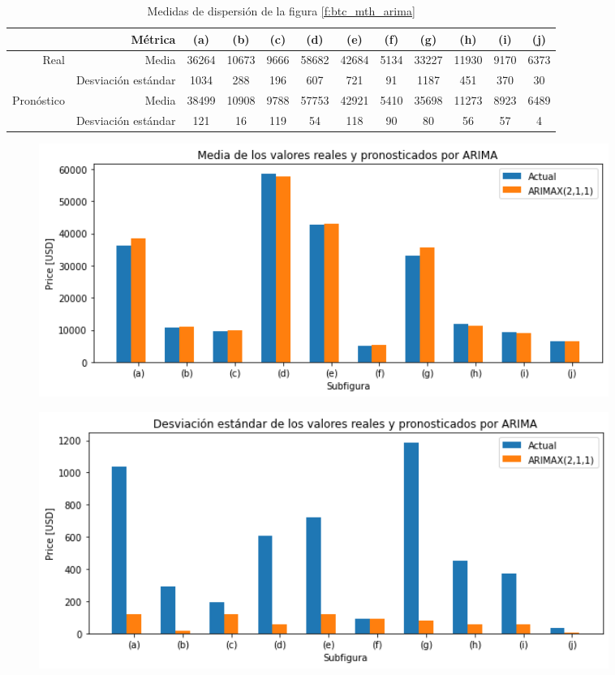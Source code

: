 \documentclass[a4paper,10pt]{article}
\begin{document}
\begin{table}[H]
 \begin{center}
 \resizebox{12cm}{!} {
  \begin{tabular}{|r|r|c|c|c|c|c|c|c|c|c|c|}
    & Métrica & (a) & (b) & (c) & (d) & (e) & (f) & (g) & (h) & (i) & (j) \\ \hline
    Real & Media & 36264& 10673& 9666& 58682& 42684& 5134& 33227& 11930& 9170& 6373 \\
    & Desviación estándar & 1034& 288 & 196& 607& 721& 91& 1187& 451& 370& 30 \\
    Pronóstico & Media & 38499 & 10908& 9788& 57753& 42921& 5410& 35698& 11273& 8923& 6489 \\
    & Desviación estándar & 121& 16& 119& 54& 118& 90& 80& 56& 57& 4 \\ \hline
  \end{tabular}
  }
  \caption{Medidas de dispersión de la figura \ref{f:btc_mth_arima}}
  \label{tab:btc_mth_avestd}
 \end{center}
\end{table}

\begin{figure}[H]
\centering
\includegraphics[width=0.9\textwidth]{./plots/arima/plots_btc_random_monthly/ave}
\label{f:btc_ave_mh}
\end{figure}


\begin{figure}[H]
\centering
\includegraphics[width=0.9\textwidth]{./plots/arima/plots_btc_random_monthly/std}
\label{f:btc_std_mh}
\end{figure}
\end{document}
